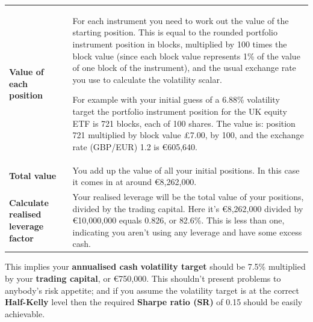 {\begin{tabularx}{\textwidth}{@{} p{} Y@{}}
\addlinespace[0.4em]
\textbf{Value of each position} & For each instrument you need to work out the value of the starting position. This is equal to the rounded portfolio instrument position in blocks, multiplied by 100 times the block value (since each block value represents 1\% of the value of one block of the instrument), and the usual exchange rate you use to calculate the volatility scalar. \par For example with your initial guess of a 6.88\% volatility target the portfolio instrument position for the UK equity ETF is 721 blocks, each of 100 shares. The value is: position 721 multiplied by block value £7.00, by 100, and the exchange rate (GBP/EUR) 1.2 is €605,640. \\
\addlinespace[0.4em]
\textbf{Total value} & You add up the value of all your initial positions. In this case it comes in at around €8,262,000. \\
\addlinespace[0.4em]
\textbf{Calculate realised leverage factor} & Your realised leverage will be the total value of your positions, divided by the trading capital. Here it's €8,262,000 divided by €10,000,000 equals 0.826, or 82.6\%. This is less than one, indicating you aren't using any leverage and have some excess cash. \\
\end{tabularx}
}

\medskip


This implies your \textbf{annualised cash} \textbf{volatility target} should be 7.5\% multiplied by your \textbf{trading capital}, or €750,000. This shouldn't present problems to anybody's risk appetite; and if you assume the volatility target is at the correct \textbf{Half-Kelly} level then the required \textbf{Sharpe ratio (SR)} of 0.15 should be easily achievable.

